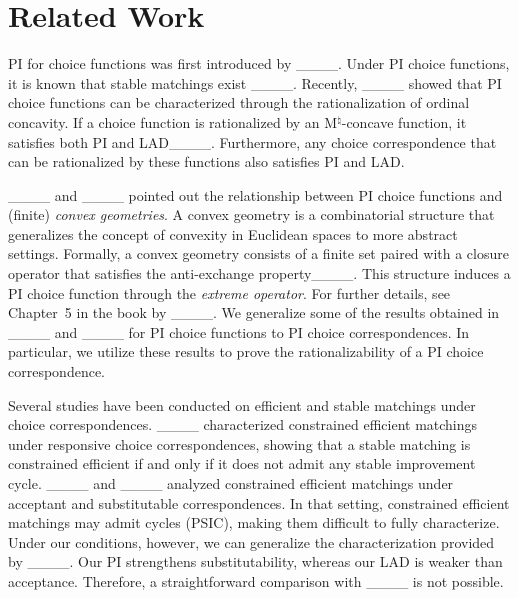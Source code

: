 \section{Related Work}

PI for choice functions was first introduced by ____. Under PI choice functions, it is known that stable matchings exist ____. Recently, ____ showed that PI choice functions can be characterized through the rationalization of ordinal concavity. If a choice function is rationalized by an M${}^\natural$-concave function, it satisfies both PI and LAD____. Furthermore, any choice correspondence that can be rationalized by these functions also satisfies PI and LAD.

____ and ____ pointed out the relationship between PI choice functions and (finite) \emph{convex geometries}.
A convex geometry is a combinatorial structure that generalizes the concept of convexity in Euclidean spaces to more abstract settings. 
Formally, a convex geometry consists of a finite set paired with a closure operator that satisfies the anti-exchange property____. This structure induces a PI choice function through the \emph{extreme operator}. For further details, see Chapter~5 in the book by ____. %
We generalize some of the results obtained in ____ and ____ for PI choice functions to PI choice correspondences. In particular,  we utilize these results to prove the rationalizability of a PI choice correspondence.

Several studies have been conducted on efficient and stable matchings under choice correspondences.
____ characterized constrained efficient matchings under responsive choice correspondences, showing that a stable matching is constrained efficient if and only if it does not admit any stable improvement cycle.
____ and ____ analyzed constrained efficient matchings under acceptant and substitutable correspondences. In that setting, constrained efficient matchings may admit cycles (PSIC), making them difficult to fully characterize.
Under our conditions, however, we can generalize the characterization provided by ____.
Our PI strengthens substitutability, whereas our LAD is weaker than acceptance. Therefore, a straightforward comparison with ____ is not possible.

